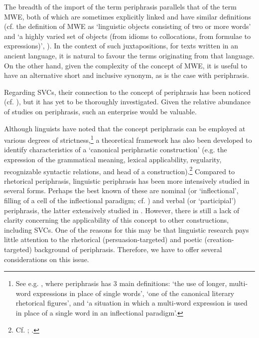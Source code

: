 \documentclass[output=paper,colorlinks,citecolor=brown]{langscibook}
\begin{document}
The breadth of the import of the term periphrasis parallels that of the term MWE, both of which are sometimes explicitly linked and have similar definitions (cf. the definition of MWE as ‘linguistic objects consisting of two or more words' and ‘a highly varied set of objects (from idioms to collocations, from formulae to expressions)', \citealt{Masini2019}). In the context of such juxtapositions, for texts written in an ancient language, it is natural to favour the terms originating from that language. On the other hand, given the complexity of the concept of MWE, it is useful to have an alternative short and inclusive synonym, as is the case with periphrasis.

Regarding SVCs, their connection to the concept of periphrasis has been noticed (cf. \citealt[183]{JimenezLopez2016}), but it has yet to be thoroughly investigated. Given the relative abundance of studies on periphrasis, such an enterprise would be valuable.

Although linguists have noted that the concept periphrasis can be employed at various degrees of strictness,\footnote{See e.g. \citet[654--655]{Haspelmath2000}, where periphrasis has 3 main definitions: ‘the use of longer, multi-word expressions in place of single words', ‘one of the canonical literary rhetorical figures', and ‘a situation in which a multi-word expression is used in place of a single word in an inflectional paradigm'.} a theoretical framework has also been developed to identify characteristics of a ‘canonical periphrastic construction' (e.g. the expression of the grammatical meaning, lexical applicability, regularity, recognizable syntactic relations, and head of a construction).\footnote{Cf. \citet[249--250]{Chumakina2011}; \citet[244]{Brown-etal2012}.} Compared to rhetorical periphrasis, linguistic periphrasis has been more intensively studied in several forms. Perhaps the best known of these are nominal (or ‘inflectional', filling of a cell of the inflectional paradigm; cf. \citealt{Chumakina2011, Chumakina-Corbett2012}) and verbal (or ‘participial') periphrasis, the latter extensively studied in \citet{Bentein2016}. However, there is still a lack of clarity concerning the applicability of this concept to other constructions, including SVCs. One of the reasons for this may be that linguistic research pays little attention to the rhetorical (persuasion-targeted) and poetic (creation-targeted) background of periphrasis. Therefore, we have to offer several considerations on this issue.
\end{document}
